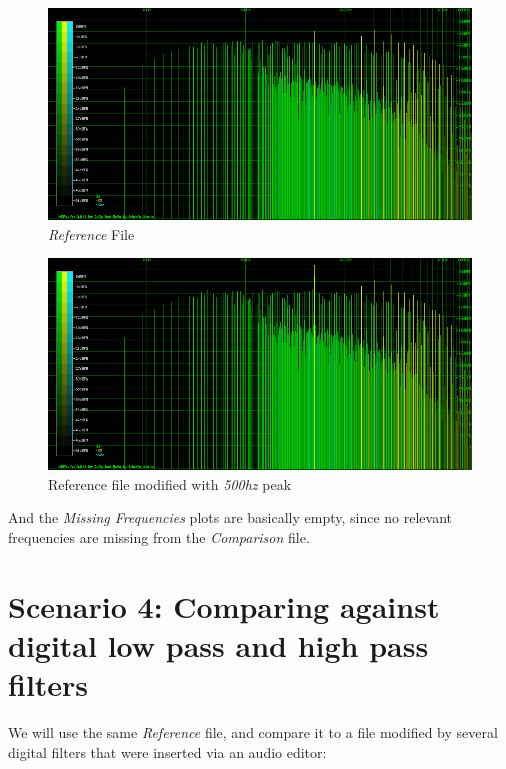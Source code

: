 \documentclass[10pt,a4paper]{report}
\newcommand{\fhz}[1]{\textit{#1\acrshort{hz}}}
\begin{document}
\begin{figure}[H]
	\centering
	\includegraphics[width=1.0\linewidth]{images/interpretation/Plot3-Spectrogram.png}
	\caption[Reference File]{\textit{Reference} File}
	\label{fig:plot3-spectrogram}
\end{figure}

\begin{figure}[H]
	\centering
	\includegraphics[width=1.0\linewidth]{images/interpretation/Plot3-Spectrogram-500hz.png}
	\caption[Reference File]{Reference file modified with \fhz{500} peak}
	\label{fig:plot3-spectrogram-500Hz}
\end{figure}


And the \textit{Missing Frequencies} plots are basically empty, since no relevant frequencies are missing from the \textit{Comparison} file.

\section{Scenario 4: Comparing against digital low pass and high pass filters}

We will use the same \textit{Reference} file, and compare it to a file modified by several digital filters that were inserted via an audio editor:
\end{document}
